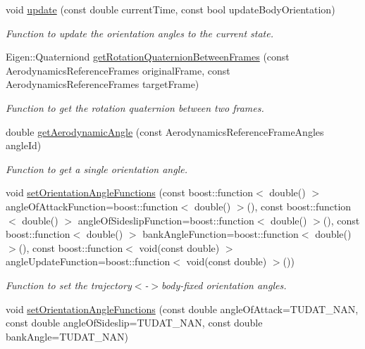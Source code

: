 \begin{DoxyCompactItemize}
void \hyperlink{classtudat_1_1reference__frames_1_1AerodynamicAngleCalculator_acdeec390f822d521bcb3c09168da5a57}{update} (const double current\+Time, const bool update\+Body\+Orientation)
\begin{DoxyCompactList}\small\item\em Function to update the orientation angles to the current state. \end{DoxyCompactList}\item 
Eigen\+::\+Quaterniond \hyperlink{classtudat_1_1reference__frames_1_1AerodynamicAngleCalculator_a589f1ac87019bd9ec7cebb366fc7a700}{get\+Rotation\+Quaternion\+Between\+Frames} (const Aerodynamics\+Reference\+Frames original\+Frame, const Aerodynamics\+Reference\+Frames target\+Frame)
\begin{DoxyCompactList}\small\item\em Function to get the rotation quaternion between two frames. \end{DoxyCompactList}\item 
double \hyperlink{classtudat_1_1reference__frames_1_1AerodynamicAngleCalculator_adf020e81f7cc48e456d133670c087671}{get\+Aerodynamic\+Angle} (const Aerodynamics\+Reference\+Frame\+Angles angle\+Id)
\begin{DoxyCompactList}\small\item\em Function to get a single orientation angle. \end{DoxyCompactList}\item 
void \hyperlink{classtudat_1_1reference__frames_1_1AerodynamicAngleCalculator_a9250572fd17abf1079f2a2c9a14480d1}{set\+Orientation\+Angle\+Functions} (const boost\+::function$<$ double() $>$ angle\+Of\+Attack\+Function=boost\+::function$<$ double() $>$(), const boost\+::function$<$ double() $>$ angle\+Of\+Sideslip\+Function=boost\+::function$<$ double() $>$(), const boost\+::function$<$ double() $>$ bank\+Angle\+Function=boost\+::function$<$ double() $>$(), const boost\+::function$<$ void(const double) $>$ angle\+Update\+Function=boost\+::function$<$ void(const double) $>$())
\begin{DoxyCompactList}\small\item\em Function to set the trajectory$<$-\/$>$body-\/fixed orientation angles. \end{DoxyCompactList}\item 
void \hyperlink{classtudat_1_1reference__frames_1_1AerodynamicAngleCalculator_a7c2ca8de8fe95544225c74e6f26a975e}{set\+Orientation\+Angle\+Functions} (const double angle\+Of\+Attack=T\+U\+D\+A\+T\+\_\+\+N\+AN, const double angle\+Of\+Sideslip=T\+U\+D\+A\+T\+\_\+\+N\+AN, const double bank\+Angle=T\+U\+D\+A\+T\+\_\+\+N\+AN)

\end{DoxyCompactItemize}
